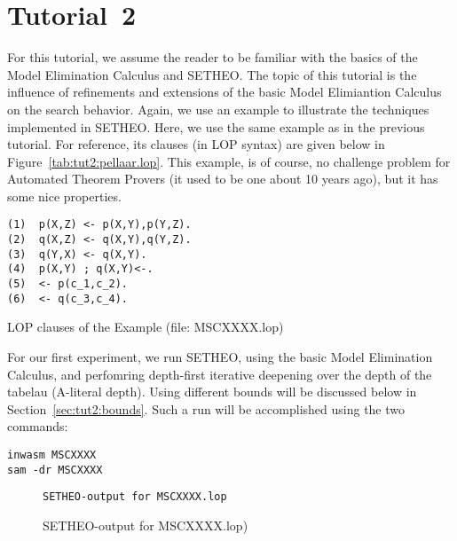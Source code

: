 %

\section{Tutorial~2}

For this tutorial, we assume the reader to be familiar with the
basics of the Model Elimination Calculus and SETHEO. The topic
of this tutorial is the influence of refinements and extensions
of the basic Model Elimiantion Calculus on the search behavior.
Again, we use an example to illustrate the techniques implemented in
SETHEO. Here, we use the same example as in the previous tutorial.
For reference, its clauses (in LOP syntax) are given below in 
Figure~\ref{tab:tut2:pellaar.lop}. This example, is of course, no
challenge problem for Automated Theorem Provers
(it used to be one about 10 years ago), but it has some nice 
properties.


\begin{table}[htb]
\begin{center}
\begin{verbatim}
(1)  p(X,Z) <- p(X,Y),p(Y,Z).
(2)  q(X,Z) <- q(X,Y),q(Y,Z).
(3)  q(Y,X) <- q(X,Y).
(4)  p(X,Y) ; q(X,Y)<-.
(5)  <- p(c_1,c_2).
(6)  <- q(c_3,c_4).
\end{verbatim}
\end{center}
\caption{LOP clauses of the Example (file: MSCXXXX.lop)}
\label{tab:tut2:pellaar.lop}
\end{table}

For our first experiment, we run SETHEO, using the basic Model Elimination
Calculus, and perfomring depth-first iterative deepening over the
depth of the tabelau (A-literal depth). Using different bounds
will be discussed below in Section~\ref{sec:tut2:bounds}.
Such a run will be accomplished using the two commands:

\begin{center}
\begin{verbatim}
inwasm MSCXXXX
sam -dr MSCXXXX
\end{verbatim}
\end{center}

\begin{figure}[htb]
\begin{center}
\begin{verbatim}
SETHEO-output for MSCXXXX.lop
\end{verbatim}
\end{center}
\caption{SETHEO-output for MSCXXXX.lop)}
\label{fig:tut2:pellaar.pure.log}
\end{figure}

